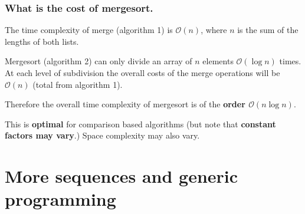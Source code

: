 \documentclass{beamer} %
\newcommand\emc[1]{\textcolor{midred}{\textbf{#1}}}
\begin{document}
\begin{frame}
\frametitle{What is the cost of mergesort.}

The time complexity of merge (algorithm 1) is $\mathcal{O}(n)$, where $n$ is the sum of the lengths of both lists.

\vspace{3mm}

Mergesort (algorithm 2) can only divide an array of $n$ elements $\mathcal{O}(\log n)$ times. At each level of subdivision the overall costs of the merge operations will be $\mathcal{O}(n)$ (total from algorithm 1).

\vspace{3mm}
Therefore the overall time complexity of mergesort is of the \emc{order $\mathcal{O}(n \log n)$}. 

\vspace{3mm}
This is \emc{optimal} for comparison based algorithms (but note that \emc{constant factors may vary}.) Space complexity may also vary.

\end{frame}

\section{More sequences and generic programming}

\end{document}
